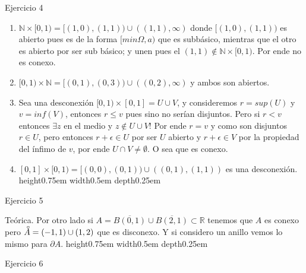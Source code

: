 \documentclass[11pt]{article}
\newcommand{\R}{{\mathbb{R}}}
\newcommand{\N}{{\mathbb{N}}}
\newcommand{\interior}[1]{\accentset{\smash{\raisebox{-0.12ex}{$\scriptstyle\circ$}}}{#1}\rule{0pt}{2.3ex}}
\newenvironment{proof}[1][Demostraci\'on]{\begin{trivlist}
\item[\hskip \labelsep {\bfseries #1}]}{\end{trivlist}}
\newcommand{\qed}{\nobreak \ifvmode \relax \else
      \ifdim\lastskip<1.5em \hskip-\lastskip
      \hskip1.5em plus0em minus0.5em \fi \nobreak
      \vrule height0.75em width0.5em depth0.25em\fi}
\begin{document}
\begin{enumerate}
\begin{proof}
\begin{enumerate}
\end{enumerate}

\end{proof}

\item {Ejercicio 4}

\begin{proof}

\begin{enumerate}

\item $\N \times [0,1) = [(1,0),(1,1)) \cup ((1,1) , \infty)$ donde $[(1,0),(1,1))$ es abierto pues es de la forma $[min \Omega , a)$ que es subb\'asico, mientras que el otro es abierto por ser sub b\'asico; y unen pues el $(1,1) \not \in \N \times [0,1)$. Por ende no es conexo.

\item $[0,1) \times \N = [(0,1),(0,3)) \cup ((0,2), \infty)$ y ambos son abiertos.

\item Sea una desconexi\'on $[0,1) \times [0,1] = U \cup V$, y consideremos $r = sup (U)$ y $v = inf(V)$, entonces $r \leq v$ pues sino no ser\'ian disjuntos. Pero si $r < v$ entonces $\exists z$ en el medio y $z \not \in U \cup V$! Por ende $r = v$ y como son disjuntos $r \in U$, pero entonces $r+ \epsilon \in U$ por ser $U$ abierto y $r+\epsilon \in V$ por la propiedad del \'infimo de $v$, por ende $U \cap V \neq \emptyset$. O sea que es conexo. 

\item $[0,1] \times [0,1) = [(0,0),(0,1)) \cup ((0,1),(1,1))$ es una desconexi\'on.\qed

\end{enumerate}

\end{proof}

\item {Ejercicio 5}

\begin{proof}

Te\'orica. Por otro lado si $A = \overline{B(0,1)} \cup \overline{B(2,1)} \subset \R$ tenemos que $A$ es conexo pero $\interior{A} = (-1,1) \cup (1,2)$ que es disconexo. Y si considero un anillo vemos lo mismo para $\partial A.$ \qed

\end{proof}

\item {Ejercicio 6}

\begin{proof}


\end{proof}
\end{enumerate}
\end{document}
